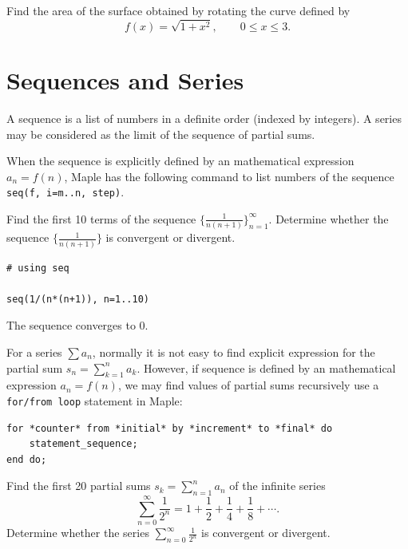 \documentclass[]{book}
\theoremstyle{definition}
\theoremstyle{definition}
\theoremstyle{definition}
\theoremstyle{remark}
\let\BeginKnitrBlock\begin \let\EndKnitrBlock\end
\begin{document}
\BeginKnitrBlock{exercise}
\protect\hypertarget{exr:unnamed-chunk-7}{}{\label{exr:unnamed-chunk-7} }
Find the area of the surface obtained by rotating the curve defined by
\[
f(x)=\sqrt{1+x^2},\qquad 0\leq x\leq 3.
\]
\EndKnitrBlock{exercise}

\hypertarget{sequences-and-series}{%
\chapter{Sequences and Series}\label{sequences-and-series}}

A sequence is a list of numbers in a definite order (indexed by integers). A series may be considered as the limit of the sequence of partial sums.

When the sequence is explicitly defined by an mathematical expression \(a_n=f(n)\), Maple has the following command to list numbers of the sequence \texttt{seq(f,\ i=m..n,\ step)}.

\BeginKnitrBlock{example}
\protect\hypertarget{exm:seq-eg}{}{\label{exm:seq-eg} }
Find the first 10 terms of the sequence \(\{\frac{1}{n(n+1)}\}_{n=1}^\infty\). Determine whether the sequence \(\{\frac{1}{n(n+1)}\}\) is convergent or divergent.
\EndKnitrBlock{example}

\BeginKnitrBlock{solution}
{}

\begin{verbatim}
# using seq

seq(1/(n*(n+1)), n=1..10)
\end{verbatim}

The sequence converges to \(0\).
\EndKnitrBlock{solution}

For a series \(\sum a_n\), normally it is not easy to find explicit expression for the partial sum \(s_n=\sum\limits_{k=1}^n a_k\). However, if sequence is defined by an mathematical expression \(a_n=f(n)\), we may find values of partial sums recursively use a \texttt{for/from\ loop} statement in Maple:

\begin{verbatim}
for *counter* from *initial* by *increment* to *final* do
    statement_sequence;
end do;
\end{verbatim}

\BeginKnitrBlock{example}
\protect\hypertarget{exm:unnamed-chunk-2}{}{\label{exm:unnamed-chunk-2} }
Find the first 20 partial sums \(s_k=\sum_{n=1}^{n}a_n\) of the infinite series
\[
\sum_{n=0}^\infty\frac1{2^n}=1+\frac12+\frac14+\frac18+\cdots.
\]
Determine whether the series \(\sum_{n=0}^\infty\frac1{2^n}\) is convergent or divergent.
\EndKnitrBlock{example}
\end{document}
